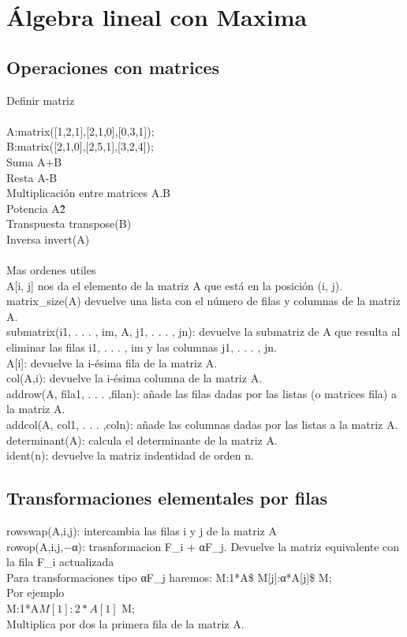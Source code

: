 \documentclass[a4paper, 12pt] {article}
\begin{document}
\section{Álgebra lineal con Maxima}

\subsection{Operaciones con matrices}
Definir matriz\\\\
A:matrix([1,2,1],[2,1,0],[0,3,1]);\\
B:matrix([2,1,0],[2,5,1],[3,2,4]);\\

Suma A+B\\
Resta A-B\\
Multiplicación entre matrices A.B\\
Potencia A\^\^2\\
Transpuesta transpose(B)\\
Inversa invert(A)\\\\

Mas ordenes utiles\\
A[i, j] nos da el elemento de la matriz A que está en la posición (i, j).\\
matrix\_size(A) devuelve una lista con el número de filas y columnas de la matriz A.\\
submatrix(i1, . . . , im, A, j1, . . . , jn): devuelve la submatriz de A que resulta al eliminar las filas i1, . . . , im y las columnas j1, . . . , jn.\\
A[i]: devuelve la i-ésima fila de la matriz A.\\
col(A,i): devuelve la i-ésima columna de la matriz A.\\
addrow(A, fila1, . . . ,filan): añade las filas dadas por las listas (o matrices fila) a la matriz A.\\
addcol(A, col1, . . . ,coln): añade las columnas dadas por las listas a la matriz A.\\
determinant(A): calcula el determinante de la matriz A.\\
ident(n): devuelve la matriz indentidad de orden n.\\

\subsection{Transformaciones elementales por filas}
rowswap(A,i,j): intercambia las filas i y j de la matriz A\\
rowop(A,i,j,−α): trasnformacion F_i + αF_j. Devuelve la matriz equivalente con la fila F_i actualizada\\
Para transformaciones tipo αF_j haremos: M:1*A\$ M[j]:α*A[j]\$ M;\\
Por ejemplo\\
M:1*A$ M[1]:2*A[1]$ M;\\
Multiplica por dos la primera fila de la matriz A.\\
\end{document}
